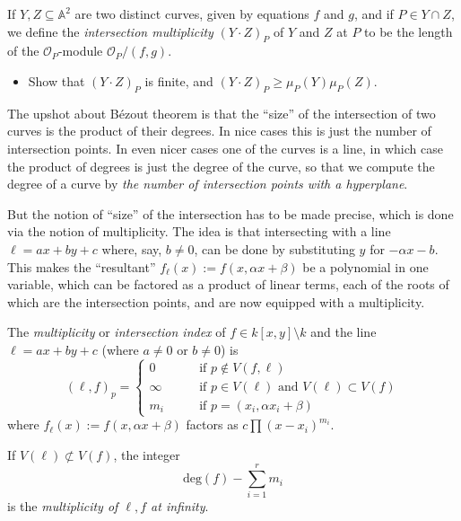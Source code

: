 \begin{exercise}
\label{exercise-intersection-multiplicity}
If $Y,Z \subseteq \mathbb{A}^2$ are two distinct curves,
given by equations $f$ and $g$, and if $P \in Y \cap Z$,
we define the {\it intersection multiplicity} $(Y \cdot Z)_P$
of $Y$ and $Z$ at $P$ to be the length of the
$\mathcal{O}_P$-module $\mathcal{O}_P/(f,g)$.
\begin{itemize}
\item Show that $(Y\cdot Z)_P$ is finite,
and $(Y\cdot Z)_P \geq  \mu_P(Y) \mu_P(Z)$.
\end{itemize}
\end{exercise}


\medskip\noindent
The upshot about Bézout theorem is that the ``size'' of the intersection
of two curves is the product of their degrees.
In nice cases this is just the number of intersection points.
In even nicer cases one of the curves is a line, 
in which case the product of degrees is
just the degree of the curve,
so that we compute the degree of a curve by
{\it the number of intersection points with a hyperplane}.

But the notion of ``size'' of the intersection
has to be made precise, which is done via the notion of multiplicity.
The idea is that intersecting with a line
$\ell=ax +by+c$ where, say,  $b \neq 0$,
can be done by substituting $y$ 
for $-\alpha x-b$.
This makes the ``resultant''
$f_\ell(x):=f(x,\alpha x+\beta)$
be a polynomial in one variable,
which can be factored as a product of linear
terms, each of the roots of which 
are the intersection points,
and are now equipped with a multiplicity.

\begin{definition}
\label{definition-multiplicity-line}
The {\it multiplicity} or {\it intersection index} 
of $f\in k[x,y]\setminus k$ and
the line $\ell=ax+by+c$ (where $a \neq 0$ or $b\neq 0$) is
$$
(\ell,f)_p =
\begin{cases}
0\qquad &\text{if }p \not\in V(f,\ell) \\
\infty \qquad &\text{if }p \in V(\ell) \text{ and }V(\ell) \subset V(f)\\
m_i \qquad & \text{if }p=(x_i,\alpha x_i+\beta)
\end{cases}
$$
where $f_\ell(x):=f(x,\alpha x+\beta)$
factors as $c\prod(x-x_i)^{m_i}$.

If $V(\ell)\not \subset V(f)$, the integer
$$
\text{deg}(f)-\sum_{i=1}^rm_i
$$
is the {\it multiplicity of $\ell,f$ at infinity}.
\end{definition}

